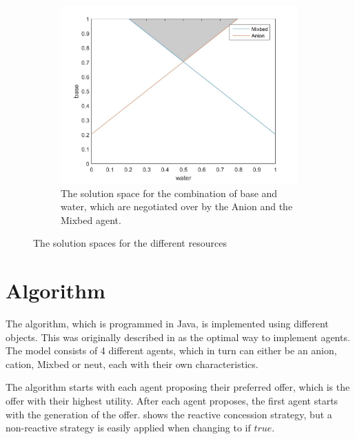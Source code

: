 \begin{figure}[h]
	\centering
	\begin{subfigure}[b]{0.7\textwidth}
		\centering
		\includegraphics[width=\linewidth]{img/reservationcurve_water_base}
		\caption{The solution space for the combination of base and water, which are negotiated over by the Anion and the Mixbed agent.}
		\label{fig:solutionwaterbase}
	\end{subfigure}

	\caption{The solution spaces for the different resources}\label{fig:solutionspace} 
\end{figure}

\clearpage
\section{Algorithm}
The algorithm, which is programmed in Java, is implemented using different objects. This was originally described in  as the optimal way to implement agents. The model consists of 4 different agents, which in turn can either be an anion, cation, Mixbed or neut, each with their own characteristics.

The algorithm starts with each agent proposing their preferred offer, which is the offer with their highest utility. After each agent proposes, the first agent starts with the generation of the offer.  shows the reactive concession strategy, but a non-reactive strategy is easily applied when changing  to $\text{if } true$.

